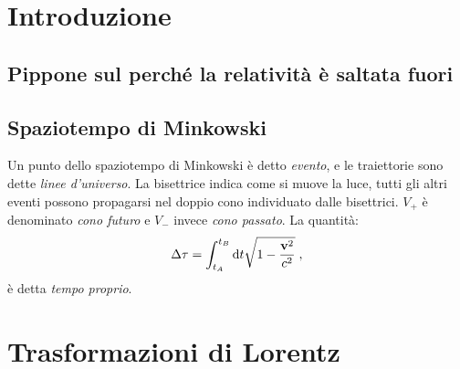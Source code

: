 \section{Introduzione}
\subsection{Pippone sul perché la relatività è saltata fuori}
\lipsum
\subsection{Spaziotempo di Minkowski}
Un punto dello spaziotempo di Minkowski è detto \textit{evento}, e le traiettorie sono dette \textit{linee d'universo}. La bisettrice 
indica come si muove la luce, tutti gli altri eventi possono propagarsi nel doppio cono individuato dalle bisettrici. $V_+$ è denominato
 \textit{cono futuro} e $V_-$ invece \textit{cono passato}. La quantità:
\begin{equation}
\Delta\tau =\int_{t_A}^{t_B}\mathrm{d}{t}\sqrt{1-\frac{\mathbf{v}^2}{c^2}}\;,
\end{equation}
è detta \textit{tempo proprio}.
\section{Trasformazioni di Lorentz}
